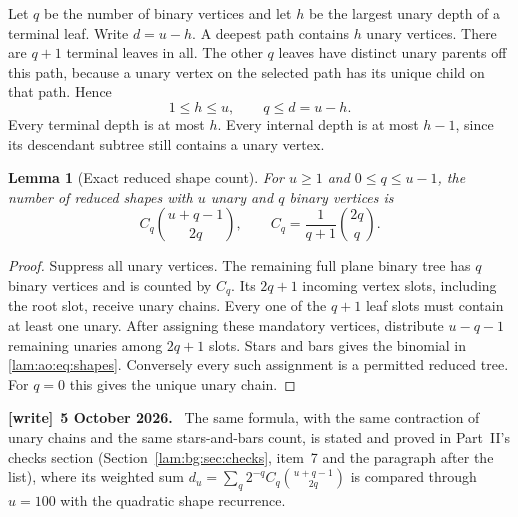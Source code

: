 \documentclass[11pt,a4paper]{article}
\numberwithin{equation}{section}
\newtheorem{lemma}[theorem]{Lemma}
\theoremstyle{remark}
\newenvironment{writenote}[1][]{\par\smallskip\begingroup\small
 \noindent\textbf{[write]}\if\relax\detokenize{#1}\relax\else~\textbf{#1.}\fi\ }%
 {\par\endgroup\smallskip}
\begin{document}
Let $q$ be the number of binary vertices and let $h$ be the largest unary depth of a terminal leaf. Write $d=u-h$. A deepest path contains $h$ unary vertices. There are $q+1$ terminal leaves in all. The other $q$ leaves have distinct unary parents off this path, because a unary vertex on the selected path has its unique child on that path. Hence
\begin{equation}\label{lam:ao:eq:qdeficit}
 1\le h\le u,\qquad q\le d=u-h.
\end{equation}
Every terminal depth is at most $h$. Every internal depth is at most $h-1$, since its descendant subtree still contains a unary vertex.

\begin{lemma}[Exact reduced shape count]\label{lam:ao:lem:shapes}
For $u\ge1$ and $0\le q\le u-1$, the number of reduced shapes with $u$ unary and $q$ binary vertices is
\begin{equation}\label{lam:ao:eq:shapes}
 C_q\binom{u+q-1}{2q},\qquad C_q=\frac1{q+1}\binom{2q}{q}.
\end{equation}
\end{lemma}
\begin{proof}
Suppress all unary vertices. The remaining full plane binary tree has $q$ binary vertices and is counted by $C_q$. Its $2q+1$ incoming vertex slots, including the root slot, receive unary chains. Every one of the $q+1$ leaf slots must contain at least one unary. After assigning these mandatory vertices, distribute $u-q-1$ remaining unaries among $2q+1$ slots. Stars and bars gives the binomial in \eqref{lam:ao:eq:shapes}. Conversely every such assignment is a permitted reduced tree. For $q=0$ this gives the unique unary chain.
\end{proof}
\begin{writenote}[5 October 2026]
The same formula, with the same contraction of unary chains and the same stars-and-bars count, is stated and proved in Part~II's checks section (Section~\ref{lam:bg:sec:checks}, item~7 and the paragraph after the list), where its weighted sum $d_u=\sum_q2^{-q}C_q\binom{u+q-1}{2q}$ is compared through $u=100$ with the quadratic shape recurrence.
\end{writenote}
\end{document}
